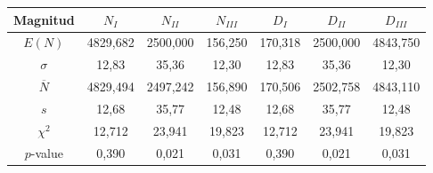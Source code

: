 \begin{tabular}{c|cccccc}
\hline
Magnitud & $N_I$ & $N_{II}$ & $N_{III}$ & $D_I$ & $D_{II}$ & $D_{III}$ \\
\hline
$E(N)$ & 4829{,}682 & 2500{,}000 & 156{,}250 & 170{,}318 & 2500{,}000 & 4843{,}750 \\
$\sigma$ & 12{,}83 & 35{,}36 & 12{,}30 & 12{,}83 & 35{,}36 & 12{,}30 \\
$\overline{N}$ & 4829{,}494 & 2497{,}242 & 156{,}890 & 170{,}506 & 2502{,}758 & 4843{,}110 \\
$s$ & 12{,}68 & 35{,}77 & 12{,}48 & 12{,}68 & 35{,}77 & 12{,}48 \\
$\chi^2$ & 12{,}712 & 23{,}941 & 19{,}823 & 12{,}712 & 23{,}941 & 19{,}823 \\
$p$-value & 0{,}390 & 0{,}021 & 0{,}031 & 0{,}390 & 0{,}021 & 0{,}031 \\
\hline
\end{tabular}
